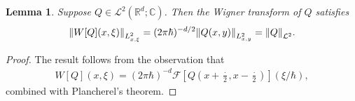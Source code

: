 \documentclass[10pt,a4paper]{article}
\theoremstyle{plain}
\newtheorem{lemma}[theorem]{Lemma}
\theoremstyle{remark}
\newcommand{\br}[1]{\left(#1\right)}
\newcommand{\sbr}[1]{\left[#1\right]}
\newcommand{\mytextfrac}[2]{{\textstyle\frac{#1}{#2}}}
\newcommand{\R}{\mathbb{R}}
\newcommand{\C}{\mathbb{C}}
\begin{document}
\begin{lemma}\label{L2normofWigner}
Suppose $Q\in\mathcal L^2(\R^d;\C)$. Then the Wigner transform of $Q$ satisfies
\begin{align*}
\norm{W[Q](x,\xi)}_{L^2_{x,\xi}}=(2\pi\hbar)^{-d/2}\norm{Q(x,y)}_{L^2_{x,y}}=\norm{Q}_{\mathcal L^2}.
\end{align*}
\end{lemma}

\begin{proof}
The result follows from the observation that
\begin{align*}
W[Q](x,\xi)=(2\pi\hbar)^{-d}\mathcal F\sbr{Q\br{x+\mytextfrac{\cdot}{2},x-\mytextfrac{\cdot}{2}}}\br{\xi/\hbar},
\end{align*}combined with Plancherel's theorem.
\end{proof}
\end{document}

